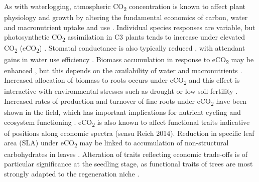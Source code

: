 \documentclass[12pt,a4paper]{memoir}
\begin{document}
As with waterlogging, atmospheric CO\textsubscript{2} concentration is known to affect plant physiology and growth by altering the fundamental economics of carbon, water and macronutrient uptake and use \citep{Poorter2003a, Wang2012, Reich2014}.  Individual species responses are variable, but photosynthetic CO\textsubscript{2} assimilation in C3 plants tends to increase under elevated CO\textsubscript{2} (eCO\textsubscript{2}) \citep{Curtis1996}. Stomatal conductance is also typically reduced \citep{Ainsworth2007}, with attendant gains in water use efficiency \citep{Holtum2010, Keenan2013, VanderSleen2014}. Biomass accumulation in response to eCO\textsubscript{2} may be enhanced \citep{Wang2012}, but this depends on the availability of water and macronutrients \citep{Korner2006, Manea2014, Reich2014}. Increased allocation of biomass to roots occurs under eCO\textsubscript{2} \citep{Nie2013} and this effect is interactive with environmental stresses such as drought or low soil fertility \citep{Wang2010}. Increased rates of production and turnover of fine roots under eCO\textsubscript{2} have been shown in the field, which has important implications for nutrient cycling and ecosystem functioning \citep{Pregitzer1995, Pregitzer2000, Matamala2000, Lipson2014}. eCO\textsubscript{2} is also known to affect functional traits indicative of positions along economic spectra (sensu Reich 2014). Reduction in specific leaf area (SLA) under eCO\textsubscript{2} may be linked to accumulation of non-structural carbohydrates in leaves \citep{Poorter2003a, Bader2010}. Alteration of traits reflecting economic trade-offs is of particular significance at the seedling stage, as functional traits of trees are most strongly adapted to the regeneration niche \citep{Poorter2007}.
\end{document}

